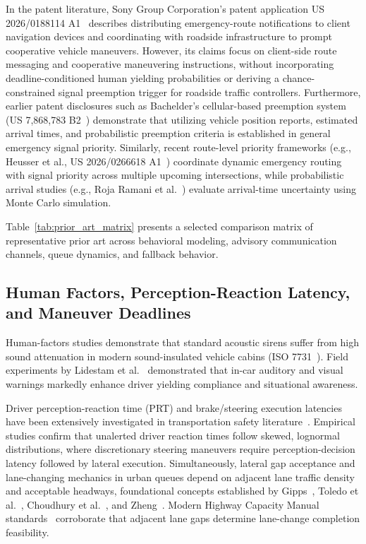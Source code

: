 \documentclass[journal,10pt,twocolumn]{IEEEtran}
\begin{document}
In the patent literature, Sony Group Corporation's patent application US 2026/0188114 A1~\cite{sony2026} describes distributing emergency-route notifications to client navigation devices and coordinating with roadside infrastructure to prompt cooperative vehicle maneuvers. However, its claims focus on client-side route messaging and co\-operative maneuvering instructions, without incorporating deadline-conditioned human yielding probabilities or deriving a chance-constrained signal preemption trigger for roadside traffic controllers. Furthermore, earlier patent disclosures such as Bachelder's cellular-based preemption system (US 7,868,783 B2~\cite{bachelder2011}) demonstrate that utilizing vehicle position reports, estimated arrival times, and probabilistic preemption criteria is established in general emergency signal priority. Similarly, recent route-level priority frameworks (e.g., Heusser et al., US 2026/0266618 A1~\cite{us20260266618}) coordinate dynamic emergency routing with signal priority across multiple upcoming intersections, while probabilistic arrival studies (e.g., Roja Ramani et al.~\cite{ieee_prob_preempt2026}) evaluate arrival-time uncertainty using Monte Carlo simulation. 

Table~\ref{tab:prior_art_matrix} presents a selected comparison matrix of representative prior art across behavioral modeling, advisory communication channels, queue dynamics, and fallback behavior.

\subsection{Human Factors, Perception-Reaction Latency, and Maneuver Deadlines}
Human-factors studies demonstrate that standard acoustic sirens suffer from high sound attenuation in modern sound-insulated vehicle cabins (ISO 7731~\cite{iso7731}). Field experiments by Lidestam et al.~\cite{lidestam2020} demonstrated that in-car auditory and visual warnings markedly enhance driver yielding compliance and situational awareness. 

Driver perception-reaction time (PRT) and brake/steering execution latencies have been extensively investigated in transportation safety literature~\cite{green2000prt,taoka1989brake,koppa2000human,lerner1996prt,fitch2014alerts}. Empirical studies confirm that unalerted driver reaction times follow skewed, lognormal distributions, where discretionary steering maneuvers require perception-decision latency followed by lateral execution. Simultaneously, lateral gap acceptance and lane-changing mechanics in urban queues depend on adjacent lane traffic density and acceptable headways, foundational concepts established by Gipps~\cite{gipps1986lane}, Toledo et al.~\cite{toledo2003driving}, Choudhury et al.~\cite{choudhury2007lane}, and Zheng~\cite{zheng2014lane}. Modern Highway Capacity Manual standards~\cite{hcm2016} corroborate that adjacent lane gaps determine lane-change completion feasibility.
\end{document}
